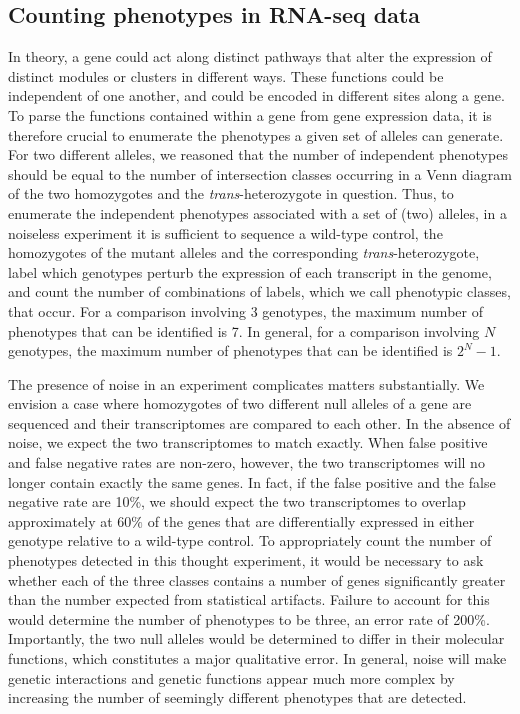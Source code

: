 \documentclass[10pt, twocolumn]{article}
\begin{document}
\subsection*{Counting phenotypes in RNA-seq data}
In theory, a gene could act along distinct pathways that alter the expression of
distinct modules or clusters in different ways. These functions could be
independent of one another, and could be encoded in different sites along a
gene. To parse the functions contained within a gene from gene expression data,
it is therefore crucial to enumerate the phenotypes a given set of alleles can
generate. For two different alleles, we reasoned that the number of independent
phenotypes should be equal to the number of intersection classes occurring in a
Venn diagram of the two homozygotes and the \emph{trans}-heterozygote in
question. Thus, to enumerate the independent phenotypes associated with a set of
(two) alleles, in a noiseless experiment it is sufficient to sequence a
wild-type control, the homozygotes of the mutant alleles and the corresponding
\emph{trans}-heterozygote, label which genotypes perturb the expression of each
transcript in the genome, and count the number of combinations of labels, which
we call phenotypic classes, that occur. For a comparison involving 3 genotypes,
the maximum number of phenotypes that can be identified is 7. In general, for a
comparison involving $N$ genotypes, the maximum number of phenotypes that can be
identified is $2^N-1$.

The presence of noise in an experiment complicates matters substantially. We
envision a case where homozygotes of two different null alleles of a gene are
sequenced and their transcriptomes are compared to each other. In the absence of
noise, we expect the two transcriptomes to match exactly. When false positive
and false negative rates are non-zero, however, the two transcriptomes will no
longer contain exactly the same genes. In fact, if the false positive and the
false negative rate are 10\%, we should expect the two transcriptomes to overlap
approximately at $60\%$ of the genes that are differentially expressed in either
genotype relative to a wild-type control. To appropriately count the number of
phenotypes detected in this thought experiment, it would be necessary to ask
whether each of the three classes contains a number of genes significantly
greater than the number expected from statistical artifacts. Failure to account
for this would determine the number of phenotypes to be three, an error rate of
200\%. Importantly, the two null alleles would be determined to differ in their
molecular functions, which constitutes a major qualitative error. In general,
noise will make genetic interactions and genetic functions appear much more
complex by increasing the number of seemingly different phenotypes that are
detected.
\end{document}
